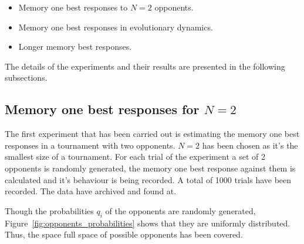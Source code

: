 \documentclass[10pt]{article}
\begin{document}
\begin{itemize}
    \item Memory one best responses to \(N=2\) opponents.
    \item Memory one best responses in evolutionary dynamics.
    \item Longer memory best responses.
\end{itemize}

The details of the experiments and their results are presented in the following
subsections.

\subsection{Memory one best responses for \(N=2\)}\label{subsection:best_response_n_2}

The first experiment that has been carried out is estimating the memory one
best responses in a tournament with two opponents. \(N=2\) has been chosen as it's
the smallest size of a tournament. For each trial of the experiment a set of
2 opponents is randomly generated, the memory one best response against them
is calculated and it's behaviour is being recorded. A total of 1000 trials have
been recorded. The data have archived and found at.

Though the probabilities \(q_i\) of the opponents are randomly generated,
Figure~\ref{fig:opponents_probabilities} shows that they are uniformly distributed.
Thus, the space full space of possible opponents has been covered.
\end{document}
